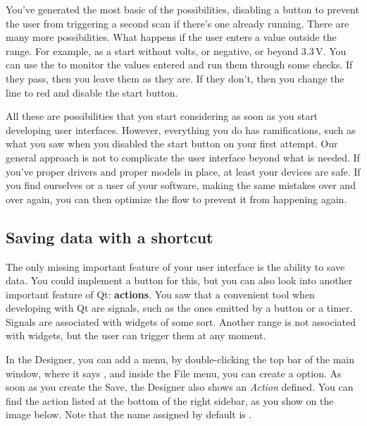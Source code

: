 You've generated the most basic of the possibilities, disabling a button to prevent the user from triggering a second scan if there's one already running. There are many more possibilities. What happens if the user enters a value outside the range. For example, as a start without volts, or negative, or beyond $3.3\,\textrm{V}$. You can use the  to monitor the values entered and run them through some checks. If they pass, then you leave them as they are. If they don't, then you change the line to red and disable the start button.

All these are possibilities that you start considering as soon as you start developing user interfaces. However, everything you do has ramifications, such as what you saw when you disabled the start button on your first attempt. Our general approach is not to complicate the user interface beyond what is needed. If you've proper drivers and proper models in place, at least your devices are safe. If you find ourselves or a user of your software, making the same mistakes over and over again, you can then optimize the flow to prevent it from happening again.

\subsection{Saving data with a shortcut}\label{subsec:saving-data-with-a-shortcut}
The only missing important feature of your user interface is the ability to save data. You could implement a button for this, but you can also look into another important feature of Qt: \textbf{actions}. You saw that a convenient tool when developing with Qt are signals, such as the ones emitted by a button or a timer. Signals are associated with widgets of some sort. Another range is not associated with widgets, but the user can trigger them at any moment.

In the Designer, you can add a  menu, by double-clicking the top bar of the main window, where it says , and inside the File menu, you can create a  option. As soon as you create the Save, the Designer also shows an \emph{Action} defined. You can find the action listed at the bottom of the right sidebar, as you show on the image below. Note that the name assigned by default is .

